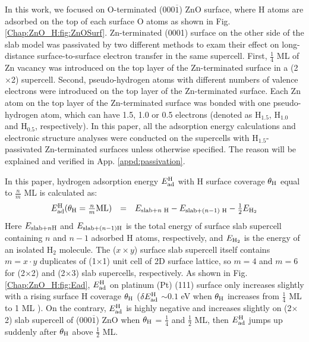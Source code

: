 In this work, we focused on O-terminated (000$\overline{1}$) ZnO surface, where H atoms are adsorbed on the top of each surface O atoms as shown in Fig. \ref{Chap:ZnO_H:fig:ZnOSurf}. Zn-terminated (0001) surface on the other side of the slab model was passivated by two different methods to exam their effect on long-distance surface-to-surface electron transfer in the same supercell. First, $\frac{1}{4}$ ML of Zn vacancy was introduced on the top layer of the Zn-terminated surface in a (2$\times$2) supercell. Second, pseudo-hydrogen atoms with different numbers of valence electrons were introduced on the top layer of the Zn-terminated surface. Each Zn atom on the top layer of the Zn-terminated surface was bonded with one pseudo-hydrogen atom, which can have 1.5, 1.0 or 0.5 electrons (denoted as H$_{1.5}$, H$_{1.0}$ and H$_{0.5}$, respectively). In this paper, all the adsorption energy calculations and electronic structure analyses were conducted on the supercells with H$_{1.5}$-passivated Zn-terminated surfaces unless otherwise specified. The reason will be explained and verified in App. \ref{appd:passivation}.

In this paper, hydrogen adsorption energy $E_{\textup{ad}}^{\textup{H}}$ with H surface coverage $\theta_{\textup{H}}$ equal to $\frac{n}{m}$ ML is calculated as:
\begin{equation}
  \begin{array}{rcl}
       E_{\textup{ad}}^{\textup{H}}(\theta_{\textup{H}}=\frac{n}{m} \textup{ML})&=&E_{\textup{slab+}n\textup{ H}}-E_{\textup{slab+}(n-1) \textup{ H}}-\frac{1}{2}E_{\textup{H}_{2}}
  \end{array}
  \label{eq1}
\end{equation}
Here $E_{\textup{slab+}n \textup{H}}$ and $E_{\textup{slab+}(n-1) \textup{H}}$ is the total energy of surface slab supercell containing $n$ and $n-1$ adsorbed H atoms, respectively, and $E_{\textup{H}_{2}}$ is the energy of an isolated H$_2$ molecule. The ($x\times y$) surface slab supercell itself contains $m=x\cdot y$ duplicates of (1$\times$1) unit cell of 2D surface lattice, so $m=4$ and $m=6$ for (2$\times$2) and (2$\times$3) slab supercells, respectively. As shown in Fig. \ref{Chap:ZnO_H:fig:Ead}, $E_{\textup{ad}}^{\textup{H}}$ on platinum (Pt) (111) surface only increases slightly with a rising surface H coverage $\theta_{\textup{H}}$ ($\delta E_{\textup{ad}}^{\textup{H}}$ $\sim0.1$ eV when  $\theta_{\textup{H}}$ increases from $\frac{1}{4}$ ML to 1 ML ). On the contrary, $E_{\textup{ad}}^{\textup{H}}$ is highly negative and increases slightly on (2$\times$2) slab supercell of (000$\overline{1}$) ZnO when  $\theta_{\textup{H}}$ = $\frac{1}{4}$ and $\frac{1}{2}$ ML, then $E_{\textup{ad}}^{\textup{H}}$ jumps up suddenly after $\theta_{\textup{H}}$ above $\frac{1}{2}$ ML. 

